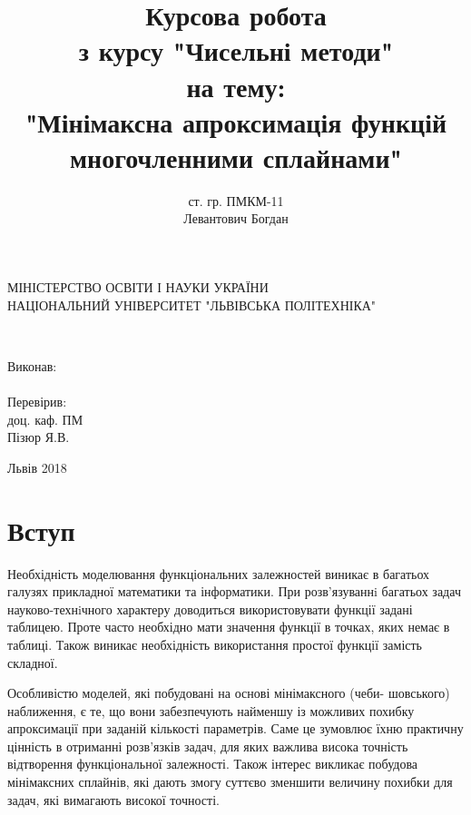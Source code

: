 \documentclass[ukrainian,14pt]{extarticle}
\begin{document}
\title{
	Курсова робота \\
	з курсу "Чисельні методи" \\
	на тему:\\
    "Мінімаксна апроксимація функцій многочленними сплайнами"
}
\author{ст. гр. ПМКМ-11 \\  Левантович Богдан}

\makeatletter
\begin{titlepage}
        \centering
	МІНІСТЕРСТВО ОСВІТИ І НАУКИ УКРАЇНИ \\
	НАЦІОНАЛЬНИЙ УНІВЕРСИТЕТ "ЛЬВІВСЬКА ПОЛІТЕХНІКА"
	\vspace{\fill}

	\@title \\
	\vspace{120pt}
	\raggedright
        \setlength{\leftskip}{11cm}
	Виконав:\\
	\@author\\
        Перевірив:\\
        доц. каф. ПМ \\
        Пізюр Я.В.\\
        \setlength{\leftskip}{0cm}
	\vspace{110pt}
	\centering


	Львів 2018
\end{titlepage}
\makeatother

\setcounter{page}{2}
\tableofcontents

\newpage


\section*{Вступ}




Необхідність моделювання функціональних залежностей виникає в
багатьох галузях прикладної математики та інформатики. При розв’язуваннi
багатьох задач науково-технiчного характеру доводиться використовувати
функції задані таблицею. Проте часто необхідно мати значення функції в
точках, яких немає в таблиці. Також виникає необхідність використання простої
функції замість складної.

Особливістю моделей, які побудовані на основі мінімаксного (чеби-
шовського) наближення, є те, що вони забезпечують найменшу із можливих
похибку апроксимації при заданій кількості параметрів. Саме це зумовлює їхню
практичну цінність в отриманні розв’язків задач, для яких важлива висока
точність відтворення функціональної залежності. Також інтерес викликає побудова
мінімаксних сплайнів, які дають змогу суттєво зменшити величину похибки для задач,
які вимагають високої точності.
\newpage
\end{document}

